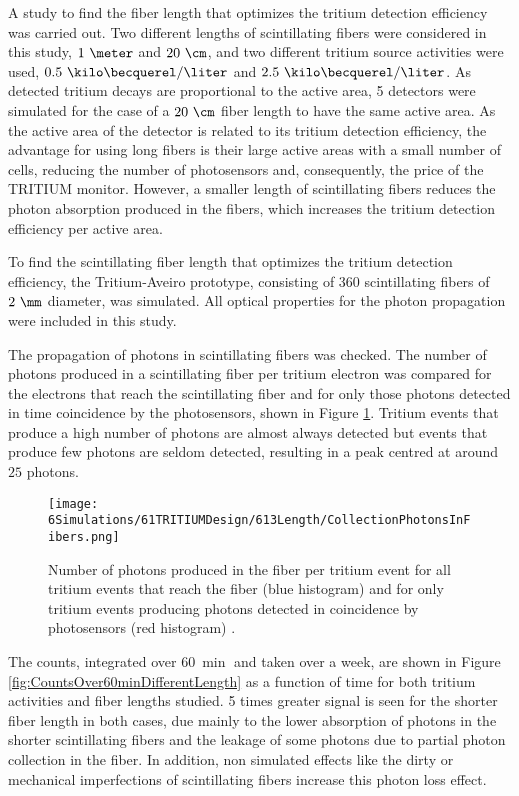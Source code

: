A study to find the fiber length that optimizes the tritium detection efficiency was carried out. Two different lengths of scintillating fibers were considered in this study, $1~\meter$ and $20~\cm$, and two different tritium source activities were used, $0.5~\kilo\becquerel/\liter$ and $2.5~\kilo\becquerel/\liter$. As detected tritium decays are proportional to the active area, 5 detectors were simulated for the case of a $20~\cm$ fiber length to have the same active area. As the active area of the detector is related to its tritium detection efficiency, the advantage for using long fibers is their large active areas with a small number of cells, reducing the number of photosensors and, consequently, the price of the TRITIUM monitor. However, a smaller length of scintillating fibers reduces the photon absorption produced in the fibers, which increases the tritium detection efficiency per active area.

To find the scintillating fiber length that optimizes the tritium detection efficiency, the Tritium-Aveiro prototype, consisting of $360$ scintillating fibers of $2~\mm$ diameter, was simulated. All optical properties for the photon propagation were included in this study. 

The propagation of photons in scintillating fibers was checked. The number of photons produced in a scintillating fiber per tritium electron was compared for the electrons that reach the scintillating fiber and for only those photons detected in time coincidence by the photosensors, shown in Figure \ref{fig:PhotonsFibersYesNoPhotosensors}. Tritium events that produce a high number of photons are almost always detected but events that produce few photons are seldom detected, resulting in a peak centred at around $25$ photons.  

\begin{figure}[h]
\centering
\texttt{[image: 6Simulations/61TRITIUMDesign/613Length/CollectionPhotonsInFibers.png]}
\caption{Number of photons produced in the fiber per tritium event for all tritium events that reach the fiber (blue histogram) and for only tritium events producing photons detected in coincidence by photosensors (red histogram) \cite{SimulationPaperCarlos}.\label{fig:PhotonsFibersYesNoPhotosensors}}
\end{figure}


The counts, integrated over $60~\min$ and taken over a week, are shown in Figure \ref{fig:CountsOver60minDifferentLength} as a function of time for both tritium activities and fiber lengths studied. 5 times greater signal is seen for the shorter fiber length in both cases, due mainly to the lower absorption of photons in the shorter scintillating fibers and the leakage of some photons due to partial photon collection in the fiber. In addition, non simulated effects like the dirty or mechanical imperfections of scintillating fibers increase this photon loss effect.

